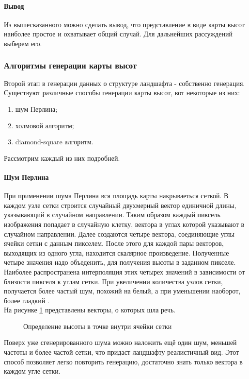 \documentclass{article}
\begin{document}
	\paragraph{Вывод}
	\indent Из вышесказанного можно сделать вывод, что представление в виде карты высот наиболее простое и охватывает общий случай. Для дальнейших рассуждений выберем его.
	\subsubsection{Алгоритмы генерации карты высот}
	\indent Второй этап в генерации данных о структуре ландшафта - собственно генерация. Существуют различные способы генерации карты высот, вот некоторые из них:
           \begin{enumerate}
		\item шум Перлина;
		\item холмовой алгоритм;
		\item diamond-square алгоритм.
	\end{enumerate}
	Рассмотрим каждый из них подробней.
	\paragraph{Шум Перлина}
	\indent При применении шума Перлина вся площадь карты накрываеться сеткой. В каждом узле сетки строится случайный двухмерный вектор единичной длины, указывающий в случайном направлении. Таким образом каждый пиксель изображения попадает в случайную клетку, вектора в углах которой указывают в случайном направлении. Далее создаются четыре вектора, соединяющие углы ячейки сетки с данным пикселем. После этого для каждой пары векторов, выходящих из одного угла, находится скалярное произведение. Полученные четыре значения надо объеденить, для получения высоты в заданном пикселе. Наиболее распространена интерполяция этих четырех значений в зависимости от близости пикселя к углам сетки. При увеличении количества узлов сетки, получается более частый шум, похожий на белый, а при уменьшении наоборот, более гладкий \cite{perlinNoise}.
\\ \indent На рисунке \hyperref[perlinDemonstrationSchema]{\ref{perlinDemonstrationSchema}} представлены векторы, о которых шла речь.
	\begin{figure}[H]
		 	\caption{Определение высоты в точке внутри ячейки сетки}
		 	\label{perlinDemonstrationSchema}
	 	\end{figure}
	\indent Поверх уже сгенерированного шума можно наложить ещё один шум, меньшей частоты и более частой сетки, что придаст ландшафту реалистичный вид. Этот способ позволяет легко повторить генерацию, достаточно знать только вектора в каждом угле сетки.
\end{document}
